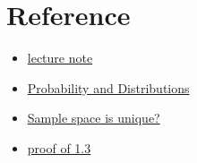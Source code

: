 \section{Reference}
\begin{itemize}
    \item \href{https://faculty.etsu.edu/gardnerr/4047/notes-Hogg-McKean-Craig.htm}{lecture note}
    \item \href{https://ccrgpages.rit.edu/~whelan/courses/2013_3fa_STAT_405/notes01.pdf}{Probability and Distributions}
    \item \href{https://www.zhihu.com/question/28624845}{Sample space is unique?}
    \item \href{https://faculty.etsu.edu/gardnerr/4047/Beamer-Hogg-McKean-Craig/Proofs-HMC-1-3.pdf}{proof of 1.3}
\end{itemize}
